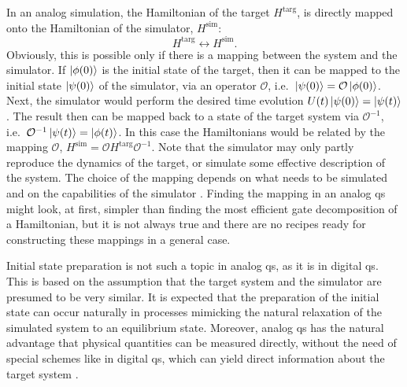 In an analog simulation, the Hamiltonian of the target $H^{\text{targ}}$, is directly mapped onto the Hamiltonian of the simulator, $H^{\text{sim}}$:
\begin{equation*}
    H^{\text{targ}} \longleftrightarrow H^{\text{sim}}.
\end{equation*}
Obviously, this is possible only if there is a mapping between the system and the simulator.
If $\ket{\phi(0)}$ is the initial state of the target, then it can be mapped to the initial state $\ket{\psi(0)}$ of the simulator, via an operator $\mathcal{O}$, i.e.~$\ket{\psi(0)} = \mathcal{O} \ket{\phi(0)}$.
Next, the simulator would perform the desired time evolution $U(t) \ket{\psi(0)} = \ket{\psi(t)}$.
The result then can be mapped back to a state of the target system via $\mathcal{O}^{-1}$, i.e.~$\mathcal{O}^{-1}\ket{\psi(t)} = \ket{\phi(t)}$.
In this case the Hamiltonians would be related by the mapping $\mathcal{O}$, $H^{\text{sim}} = \mathcal{O} H^{\text{targ}} \mathcal{O}^{-1}$.
Note that the simulator may only partly reproduce the dynamics of the target, or simulate some effective description of the system.
The choice of the mapping depends on what needs to be simulated and on the capabilities of the simulator \cite{georgescu2014simulation}.
Finding the mapping in an analog \ac{qs} might look, at first, simpler than finding the most efficient gate decomposition of a Hamiltonian, but it is not always true and there are no recipes ready for constructing these mappings in a general case.

Initial state preparation is not such a topic in analog \ac{qs}, as it is in digital \ac{qs}.
This is based on the assumption that the target system and the simulator are presumed to be very similar.
It is expected that the preparation of the initial state can occur naturally in processes mimicking the natural relaxation of the simulated system to an equilibrium state.
Moreover, analog \ac{qs} has the natural advantage that physical quantities can be measured directly, without the need of special schemes like in digital \ac{qs}, which can yield direct information about the target system \cite{hauke2012simulators}.

